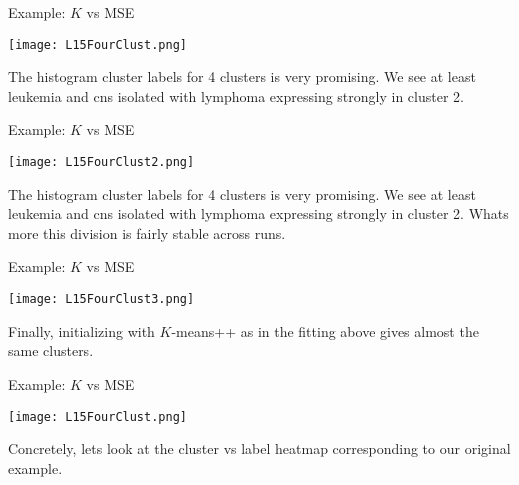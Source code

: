 \documentclass[10pt, table, dvipsnames,xcdraw,handout]{beamer}
\begin{document}
\begin{frame}[fragile]{Example: $K$ vs MSE}
  \begin{minipage}[t][0.5\textheight][t]{\textwidth}
	\centering \texttt{[image: L15FourClust.png]} 
  \end{minipage}
  \vfill
\begin{minipage}[t][0.5\textheight][t]{\textwidth}
The histogram cluster labels for 4 clusters is very promising. We see at least leukemia and cns isolated with lymphoma expressing strongly in cluster 2. 
\end{minipage}
\end{frame}

\begin{frame}[fragile]{Example: $K$ vs MSE}
  \begin{minipage}[t][0.5\textheight][t]{\textwidth}
	\centering \texttt{[image: L15FourClust2.png]} 
  \end{minipage}
  \vfill
\begin{minipage}[t][0.5\textheight][t]{\textwidth}
The histogram cluster labels for 4 clusters is very promising. We see at least leukemia and cns isolated with lymphoma expressing strongly in cluster 2. Whats more this division is fairly stable across runs. 
\end{minipage}
\end{frame}




\begin{frame}[fragile]{Example: $K$ vs MSE}
  \begin{minipage}[t][0.5\textheight][t]{\textwidth}
	\centering \texttt{[image: L15FourClust3.png]} 
  \end{minipage}
  \vfill
\begin{minipage}[t][0.5\textheight][t]{\textwidth}
Finally, initializing with $K$-means++ as in the fitting above gives almost the same clusters. 
\end{minipage}
\end{frame}


\begin{frame}[fragile]{Example: $K$ vs MSE}
  \begin{minipage}[t][0.5\textheight][t]{\textwidth}
	\centering \texttt{[image: L15FourClust.png]} 
  \end{minipage}
  \vfill
\begin{minipage}[t][0.5\textheight][t]{\textwidth}
Concretely, lets look at the cluster vs label heatmap corresponding to our original example. 
\end{minipage}
\end{frame}
\end{document}

